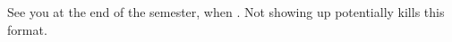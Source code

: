 \documentclass[aspectratio=169]{beamer}
\newcommand{\chosenbook}{chosen book}
\begin{document}
\begin{frame}
  \begin{takeaway}
    See you at the end of the semester, when
    .
    Not showing up potentially kills this format.
  \end{takeaway}
\end{frame}

%
%
%
%
%
\end{document}
